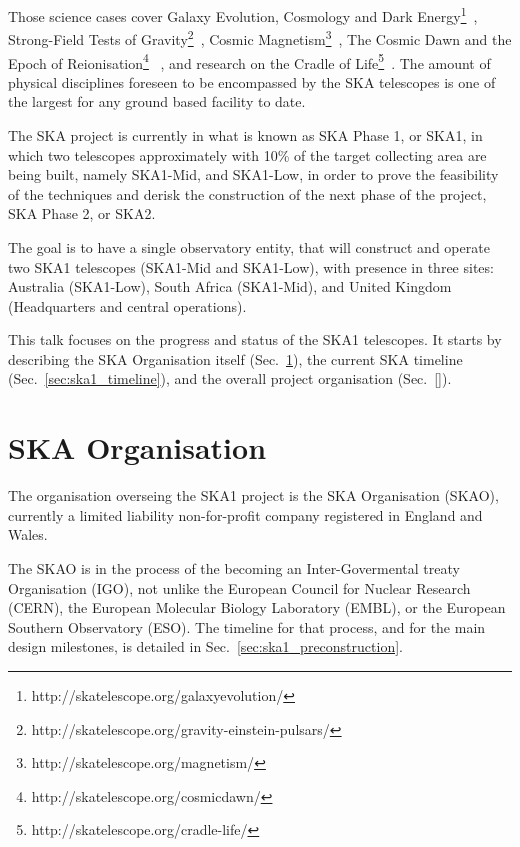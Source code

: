 \documentclass[a4paper,
               biblatex,       %
               keeplastbox,    %
               ]{jacow-2_1}    %
\begin{document}
Those science cases cover Galaxy Evolution, Cosmology and Dark Energy\footnote{http://skatelescope.org/galaxyevolution/}~\cite{2015aska.confE..67P, 2015aska.confE..16M, 2015aska.confE..51F}, Strong-Field Tests of Gravity\footnote{http://skatelescope.org/gravity-einstein-pulsars/}~\cite{2015aska.confE..36K}, Cosmic Magnetism\footnote{http://skatelescope.org/magnetism/}~\cite{2015aska.confE..92J}, The Cosmic Dawn and the Epoch of Reionisation\footnote{http://skatelescope.org/cosmicdawn/} ~\cite{2015aska.confE...1K}, and research on the Cradle of Life\footnote{http://skatelescope.org/cradle-life/}~\cite{2015aska.confE.115H}. The amount of physical disciplines foreseen to be encompassed by the SKA telescopes is one of the largest for any ground based facility to date.

The SKA project is currently in what is known as SKA Phase 1, or SKA1, in which two telescopes approximately with 10\% of the target collecting area are being built, namely SKA1-Mid, and SKA1-Low, in order to prove the feasibility of the techniques and derisk the construction of the next phase of the project, SKA Phase 2, or SKA2.

The goal is to have a single observatory entity, that will construct and operate two SKA1 telescopes (SKA1-Mid and SKA1-Low), with presence in three sites: Australia (SKA1-Low), South Africa (SKA1-Mid), and United Kingdom (Headquarters and central operations).

This talk focuses on the progress and status of the SKA1 telescopes. It starts by describing the SKA Organisation itself (Sec.~\ref{sec:ska_organisation}), the current SKA timeline (Sec.~\ref{sec:ska1_timeline}), and the overall project organisation (Sec.~\ref{}). 


\section{SKA Organisation} %
\label{sec:ska_organisation}
The organisation overseing the SKA1 project is the SKA Organisation (SKAO), currently a limited liability non-for-profit company registered in England and Wales.

The SKAO is in the process of the becoming an Inter-Govermental treaty Organisation (IGO), not unlike the European Council for Nuclear Research (CERN), the European Molecular Biology Laboratory (EMBL), or the European Southern Observatory (ESO). The timeline for that process, and for the main design milestones, is detailed in Sec.~\ref{sec:ska1_preconstruction}.
\end{document}
